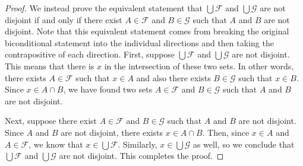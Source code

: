 \documentclass[12pt]{amsart}
\theoremstyle{definition}
\theoremstyle{remark}
\begin{document}
\begin{proof}
We instead prove the equivalent statement that $\bigcup \mathcal{F}$ and $\bigcup \mathcal{G}$ are not disjoint if and only if there exist $A \in \mathcal{F}$ and $B \in \mathcal{G}$ such that $A$ and $B$ are not disjoint.
Note that this equivalent statement comes from breaking the original biconditional statement into the individual directions and then taking the contrapositive of each direction.
First, suppose $\bigcup \mathcal{F}$ and $\bigcup \mathcal{G}$ are not disjoint.
This means that there is $x$ in the intersection of these two sets.
In other words, there exists $A \in \mathcal{F}$ such that $x \in A$ and also there exists $B \in \mathcal{G}$ such that $x \in B$.
Since $x \in A \cap B$, we have found two sets $A \in \mathcal{F}$ and $B \in \mathcal{G}$ such that $A$ and $B$ are not disjoint.

Next, suppose there exist $A \in \mathcal{F}$ and $B \in \mathcal{G}$ such that $A$ and $B$ are not disjoint.
Since $A$ and $B$ are not disjoint, there exists $x \in A \cap B$.
Then, since $x \in A$ and $A \in \mathcal{F}$, we know that $x \in \bigcup \mathcal{F}$.
Similarly, $x \in \bigcup \mathcal{G}$ as well, so we conclude that $\bigcup \mathcal{F}$ and $\bigcup \mathcal{G}$ are not disjoint.
This completes the proof.
\end{proof}
\end{document}

